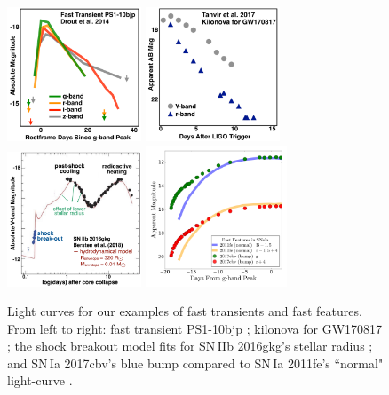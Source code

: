 \documentclass[12pt, letterpaper]{article}
\begin{document}
\begin{center}
\begin{figure}[!h]
\includegraphics[width=4cm,height=4cm]{figures/fasttrans.pdf}
\includegraphics[width=4cm,height=4cm]{figures/Tanvir_fig2_remake.pdf}
\includegraphics[width=4cm,height=4cm]{figures/2016gkg.pdf}
\includegraphics[width=4.2cm,height=4.2cm]{figures/bluebump.png}
\caption{{\footnotesize Light curves for our examples of fast transients and fast features. From left to right: fast transient PS1-10bjp \citep{2014ApJ...794...23D}; kilonova for GW170817 \citep{2017ApJ...848L..27T}; the shock breakout model fits for SN\,IIb 2016gkg's stellar radius \citep{2018Natur.554..497B}; and SN\,Ia 2017cbv's blue bump compared to SN\,Ia 2011fe's ``normal" light-curve \citep{2017ApJ...845L..11H,2015MNRAS.446.2073G}. }}
\end{figure}
\end{center}
\end{document}
